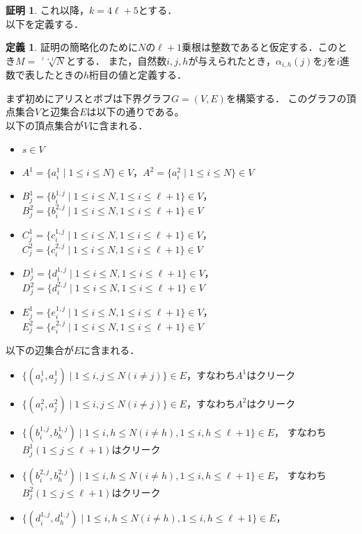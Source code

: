 \documentclass[12pt]{thesis}
\theoremstyle{definition}
\newtheorem{definition}{定義}[chapter]
\newtheorem*{prf*}{証明}
\begin{document}
\begin{prf*}
これ以降，$k = 4\ell +5$とする． \\
以下を定義する．
\begin{definition}
証明の簡略化のために$N$の$\ell + 1$乗根は整数であると仮定する．このとき$M = \sqrt[\ell + 1]{N}$とする．
また，自然数$i, j, h$が与えられたとき，$\alpha_{i, h}(j)$を$j$を$i$進数で表したときの$h$桁目の値と定義する．
\end{definition}
まず初めにアリスとボブは下界グラフ$G = (V, E)$を構築する．
このグラフの頂点集合$V$と辺集合$E$は以下の通りである。 \\
以下の頂点集合が$V$に含まれる．
\begin{itemize}
\item $s \in V$
\item $A^{1} = \{a^{1}_{i} \mid 1\leq i \leq N\}  \in V$，$A^{2} = \{a^{2}_{i} \mid 1\leq i \leq N\} \in V$
\item $B^{1}_{j} = \{b^{1,j}_{i} \mid 1\leq i \leq N,1\leq i \leq \ell+1\} \in V$，
$B^{2}_{j} = \{b^{2,j}_{i} \mid 1\leq i \leq N,1\leq i \leq \ell+1\} \in V$
\item $C^{1}_{j} = \{c^{1,j}_{i} \mid 1\leq i \leq N,1\leq i \leq \ell+1\} \in V$，
$C^{2}_{j} = \{c^{2,j}_{i} \mid 1\leq i \leq N,1\leq i \leq \ell+1\} \in V$
\item $D^{1}_{j} = \{d^{1,j}_{i} \mid 1\leq i \leq N,1\leq i \leq \ell+1\} \in V$，
$D^{2}_{j} = \{d^{2,j}_{i} \mid 1\leq i \leq N,1\leq i \leq \ell+1\} \in V$
\item $E^{1}_{j} = \{e^{1,j}_{i} \mid 1\leq i \leq N,1\leq i \leq \ell+1\} \in V$，
$E^{2}_{j} = \{e^{2,j}_{i} \mid 1\leq i \leq N,1\leq i \leq \ell+1\} \in V$
\end{itemize}
以下の辺集合が$E$に含まれる．
\begin{itemize}
\item $\{(a^{1}_{i}, a^{1}_{j}) \mid 1\leq i,j \leq N(i \neq j)\} \in E$，すなわち$A^{1}$はクリーク
\item $\{(a^{2}_{i}, a^{2}_{j}) \mid 1\leq i,j \leq N(i \neq j)\} \in E$，すなわち$A^{2}$はクリーク
\item $\{(b^{1,j}_{i}, b^{1,j}_{h}) \mid 1\leq i,h \leq N(i \neq h),1\leq i,h \leq \ell+1\} \in E$，
すなわち$B^{1}_{j}(1\leq j \leq \ell+1)$はクリーク
\item $\{(b^{2,j}_{i}, b^{2,j}_{h}) \mid 1\leq i,h \leq N(i \neq h),1\leq i,h \leq \ell+1\} \in E$，
すなわち$B^{2}_{j}(1\leq j \leq \ell+1)$はクリーク
\item $\{(d^{1,j}_{i}, d^{1,j}_{h}) \mid 1\leq i,h \leq N(i \neq h),1\leq i,h \leq \ell+1\} \in E$，

\end{itemize}
\end{prf*}
\end{document}
